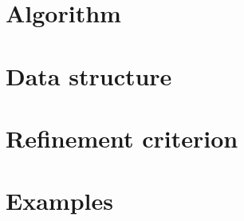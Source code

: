 \section{Algorithm}


\section{Data structure}


\section{Refinement criterion}


\section{Examples}



